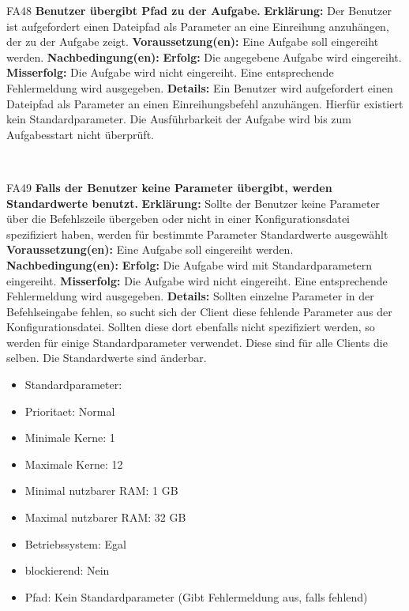 \documentclass[a4paper,12pt]{article}
\begin{document}
\begin{itemize}[nosep]
	\begin{minipage}[t]{\linewidth}
		\item[FA48] \textbf{\gls{Benutzer} übergibt Pfad zu der \gls{Aufgabe}.}
		\subitem \textbf{Erklärung:} Der \gls{Benutzer} ist aufgefordert einen Dateipfad als \gls{Parameter} an eine Einreihung anzuhängen, der zu der \gls{Aufgabe} zeigt.
		\subitem \textbf{Voraussetzung(en):} Eine \gls{Aufgabe} soll eingereiht werden.
		\subitem \textbf{Nachbedingung(en):}
		\subsubitem \textbf{Erfolg:} Die angegebene \gls{Aufgabe} wird eingereiht.
		\subsubitem \textbf{Misserfolg:} Die \gls{Aufgabe} wird nicht eingereiht. Eine entsprechende Fehlermeldung wird ausgegeben.
		\subitem \textbf{Details:} Ein \gls{Benutzer} wird aufgefordert einen Dateipfad als \gls{Parameter} an einen Einreihungsbefehl anzuhängen. Hierfür existiert kein Standardparameter. Die Ausführbarkeit der \gls{Aufgabe} wird bis zum \glspl{Aufgabe}start nicht überprüft.
	\end{minipage}
	\newline
	\\
	
	\begin{minipage}[t]{\linewidth}
		\item[FA49] \textbf{Falls der \gls{Benutzer} keine \gls{Parameter} übergibt, werden Standardwerte benutzt.}
		\subitem \textbf{Erklärung:} Sollte der \gls{Benutzer} keine \gls{Parameter} über die \gls{Befehlszeile} übergeben oder nicht in einer \gls{Konfigurationsdatei} spezifiziert haben, werden für bestimmte \gls{Parameter} Standardwerte ausgewählt
		\subitem \textbf{Voraussetzung(en):} Eine \gls{Aufgabe} soll eingereiht werden.
		\subitem \textbf{Nachbedingung(en):}
		\subsubitem \textbf{Erfolg:} Die \gls{Aufgabe} wird mit Standardparametern eingereiht.
		\subsubitem \textbf{Misserfolg:} Die \gls{Aufgabe} wird nicht eingereiht. Eine entsprechende Fehlermeldung wird ausgegeben.
		\subitem \textbf{Details:} Sollten einzelne \gls{Parameter} in der Befehlseingabe fehlen, so sucht sich der \gls{Client} diese fehlende \gls{Parameter} aus der \gls{Konfigurationsdatei}. Sollten diese dort ebenfalls nicht spezifiziert werden, so werden für einige Standardparameter verwendet.
		Diese sind für alle \glspl{Client} die selben. Die Standardwerte sind änderbar.
		\begin{itemize}[nosep,label={}]
			\item Standardparameter:
			\item \gls{Prioritaet}: Normal
			\item Minimale Kerne: 1
			\item Maximale Kerne: 12
			\item Minimal nutzbarer RAM: 1 GB
			\item Maximal nutzbarer RAM: 32 GB
			\item Betriebssystem: Egal
			\item blockierend: Nein
			\item Pfad: Kein Standardparameter (Gibt Fehlermeldung aus, falls fehlend)
	\end{itemize}
	\end{minipage}
	\newline
	\\
	

\end{itemize}
\end{document}
